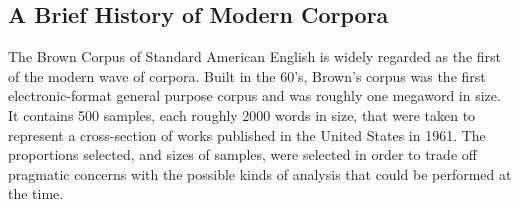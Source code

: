 % 
% 
% 
% 
% 
% 
% 
% 
% 


\subsection{A Brief History of Modern Corpora}
The Brown Corpus of Standard American English %
is widely regarded as the first of the modern wave of corpora.  Built in the 60's, Brown's corpus was the first electronic-format general purpose corpus and was roughly one megaword in size.  It contains 500 samples, each roughly 2000 words in size, that were taken to represent a cross-section of works published in the United States in 1961.  The proportions selected, and sizes of samples, were selected in order to trade off pragmatic concerns with the possible kinds of analysis that could be performed at the time.

